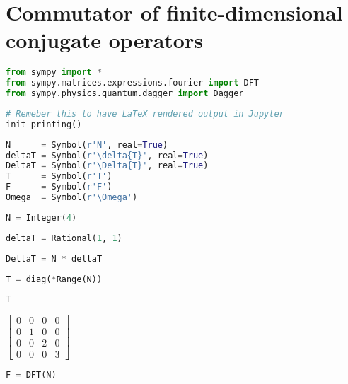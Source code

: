 \section{Commutator of finite-dimensional conjugate operators}

\begin{lstlisting}[language=Python]
from sympy import *
from sympy.matrices.expressions.fourier import DFT
from sympy.physics.quantum.dagger import Dagger
\end{lstlisting}

\begin{lstlisting}[language=Python]
# Remeber this to have LaTeX rendered output in Jupyter
init_printing()
\end{lstlisting}

\begin{lstlisting}[language=Python]
N      = Symbol(r'N', real=True)
deltaT = Symbol(r'\delta{T}', real=True)
DeltaT = Symbol(r'\Delta{T}', real=True)
T      = Symbol(r'T')
F      = Symbol(r'F')
Omega  = Symbol(r'\Omega')
\end{lstlisting}

\begin{lstlisting}[language=Python]
N = Integer(4)
\end{lstlisting}

\begin{lstlisting}[language=Python]
deltaT = Rational(1, 1)
\end{lstlisting}

\begin{lstlisting}[language=Python]
DeltaT = N * deltaT
\end{lstlisting}

\begin{lstlisting}[language=Python]
T = diag(*Range(N))
\end{lstlisting}

\begin{lstlisting}[language=Python]
T
\end{lstlisting}

\(\displaystyle \left[\begin{matrix}0 & 0 & 0 & 0\\0 & 1 & 0 & 0\\0 & 0 & 2 & 0\\0 & 0 & 0 & 3\end{matrix}\right]\)

\begin{lstlisting}[language=Python]
F = DFT(N)
\end{lstlisting}


